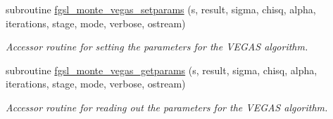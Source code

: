 \begin{DoxyCompactItemize}
subroutine \hyperlink{montecarlo_8finc_a66bf1b9d3406abbc8ec50759add82650}{fgsl\-\_\-monte\-\_\-vegas\-\_\-setparams} (s, result, sigma, chisq, alpha, iterations, stage, mode, verbose, ostream)
\begin{DoxyCompactList}\small\item\em Accessor routine for setting the parameters for the V\-E\-G\-A\-S algorithm. \end{DoxyCompactList}\item 
subroutine \hyperlink{montecarlo_8finc_a54be28890110b14d8b4d165877e77549}{fgsl\-\_\-monte\-\_\-vegas\-\_\-getparams} (s, result, sigma, chisq, alpha, iterations, stage, mode, verbose, ostream)
\begin{DoxyCompactList}\small\item\em Accessor routine for reading out the parameters for the V\-E\-G\-A\-S algorithm. \end{DoxyCompactList}\end{DoxyCompactItemize}


